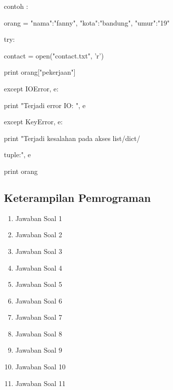 contoh :

orang = {"nama":"fanny", "kota":"bandung", "umur":"19"}

try:

    contact = open("contact.txt", 'r')
    
    print orang["pekerjaan"]
    
except IOError, e:

    print "Terjadi error IO: ", e
    
except KeyError, e:

    print "Terjadi kesalahan pada akses list/dict/
    
    tuple:", e

print orang

\subsection{Keterampilan Pemrograman}
\begin{enumerate}

\item Jawaban Soal 1


\item Jawaban Soal 2


\item Jawaban Soal 3


\item Jawaban Soal 4


\item Jawaban Soal 5


\item Jawaban Soal 6


\item Jawaban Soal 7


\item Jawaban Soal 8


\item Jawaban Soal 9

\item Jawaban Soal 10


\item Jawaban Soal 11

\end{enumerate}

